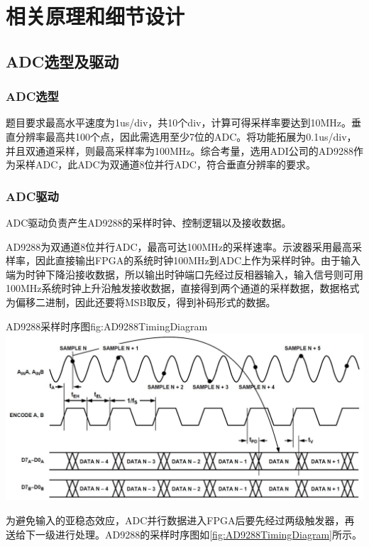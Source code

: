 \documentclass[supercite]{HustGraduPaper}
\begin{document}
	
	\section{相关原理和细节设计}
	\subsection{ADC选型及驱动}
	\subsubsection{ADC选型}
	题目要求最高水平速度为1us/div，共10个div，计算可得采样率要达到10MHz。垂直分辨率最高共100个点，因此需选用至少7位的ADC。将功能拓展为0.1us/div，并且双通道采样，则最高采样率为100MHz。综合考量，选用ADI公司的AD9288作为采样ADC，此ADC为双通道8位并行ADC，符合垂直分辨率的要求。
	
	\subsubsection{ADC驱动}
	ADC驱动负责产生AD9288的采样时钟、控制逻辑以及接收数据。
	
	AD9288为双通道8位并行ADC，最高可达100MHz的采样速率。示波器采用最高采样率，因此直接输出FPGA的系统时钟100MHz到ADC上作为采样时钟。由于输入端为时钟下降沿接收数据，所以输出时钟端口先经过反相器输入，输入信号则可用100MHz系统时钟上升沿触发接收数据，直接得到两个通道的采样数据，数据格式为偏移二进制，因此还要将MSB取反，得到补码形式的数据。
	
	\begin{generalfig}[htb]{AD9288采样时序图}{fig:AD9288TimingDiagram}
		\includegraphics[width=\textwidth]{Figures/AD9288TimingDiagram.JPG}
	\end{generalfig}
	
	为避免输入的亚稳态效应，ADC并行数据进入FPGA后要先经过两级触发器，再送给下一级进行处理。AD9288的采样时序图如\autoref{fig:AD9288TimingDiagram}所示。
	
\end{document}
